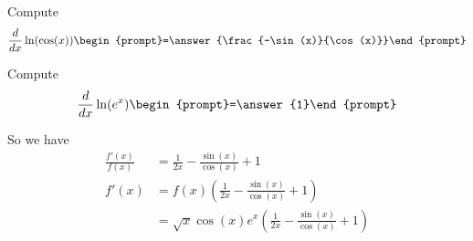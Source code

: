 \documentclass{ximera}
\begin{document}
\begin{problem}
  Compute %
  \[
  \ddx \ln(\cos(x))  \begin{prompt}=\answer{\frac{-\sin(x)}{\cos(x)}}\end{prompt}
  \]
\end{problem}

\begin{problem}
  Compute %
  \[
  \ddx \ln(e^x)  \begin{prompt}=\answer{1}\end{prompt}
  \]
\end{problem}

So we have
\begin{align*}
  \frac{f'(x)}{f(x)} &= \frac{1}{2x} - \frac{\sin(x)}{\cos(x)} + 1\\
  f'(x) &= f(x) \left(\frac{1}{2x} - \frac{\sin(x)}{\cos(x)} + 1\right)\\
  &= \sqrt{x}\cos(x)e^x\left(\frac{1}{2x} - \frac{\sin(x)}{\cos(x)} + 1\right)
\end{align*}



%
\end{document}

